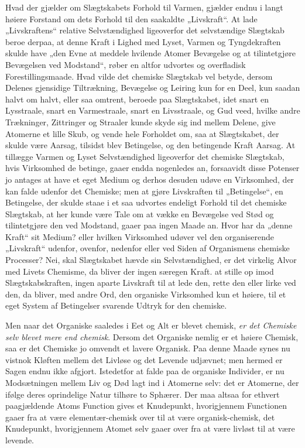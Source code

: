 \documentclass[12pt,a4paper]{book}
\begin{document}
Hvad der gjælder om Slægtskabets Forhold til Varmen, gjælder endnu
i langt høiere Forstand om dets Forhold til den saakaldte
„Livskraft“. At lade „Livskraftens“ relative Selvstændighed
ligeoverfor det selvstændige Slægtskab beroe derpaa, at denne Kraft
i Lighed med Lyset, Varmen og Tyngdekraften skulde have „den Evne
at meddele hvilende Atomer Bevægelse og at tilintetgjøre Bevægelsen
ved Modstand“, røber en altfor udvortes og overfladisk
Forestillingsmaade. Hvad vilde det chemiske Slægtskab vel betyde,
dersom Delenes gjensidige Tiltrækning, Bevægelse og Leiring kun for
en Deel, kun saadan halvt om halvt, eller saa omtrent, beroede paa
Slægtskabet, idet snart en Lysstraale, snart en Varmestraale, snart
en Livsstraale, og Gud veed,
hvilke andre Trækninger, Zittringer og Straaler kunde skyde sig ind
mellem Delene, give Atomerne et lille Skub, og vende hele Forholdet
om, saa at Slægtskabet, der skulde være Aarsag, tilsidst blev
Betingelse, og den betingende Kraft Aarsag. At tillægge Varmen og
Lyset Selvstændighed ligeoverfor det chemiske Slægtskab, hvis
Virksomhed de betinge, gaaer endda nogenledes an, forsaavidt disse
Potenser jo antages at have et eget Medium og derhos desuden udøve
en Virksomhed, der kan falde udenfor det Chemiske; men at gjøre
Livskraften til „Betingelse“, en Betingelse, der skulde staae i et
saa udvortes endeligt Forhold til det chemiske Slægtskab, at her
kunde være Tale om at vække en Bevægelse ved Stød og tilintetgjøre
den ved Modstand, gaaer paa ingen Maade an. Hvor har da „denne
Kraft“ sit Medium? eller hvilken Virksomhed udøver vel den
organiserende „Livskraft“ udenfor, ovenfor, nedenfor eller ved
Siden af Organismens chemiske Processer? Nei, skal Slægtskabet
hævde sin Selvstændighed, er det virkelig Alvor med Livets
Chemisme, da bliver der ingen særegen Kraft. at stille op imod
Slægtskabskraften, ingen aparte Livskraft til at lede den, rette
den eller lirke ved den, da bliver, med andre Ord, den organiske
Virksomhed kun et høiere, til et eget System af Betingelser
svarende Udtryk for den chemiske.

Men naar det Organiske saaledes i Eet og Alt er blevet chemisk,
\emph{er det Chemiske selv blevet mere end chemisk}. Dersom det
Organiske nemlig er et høiere Chemisk, saa er det Chemiske jo
omvendt et lavere Organisk. Paa denne Maade synes nu vistnok
Kløften mellem det Livløse og det Levende udjævnet; men hermed er
Sagen endnu ikke afgjort. Istedetfor at falde paa de organiske
Individer, er nu Modsætningen mellem Liv og Død lagt ind i Atomerne
selv: det er Atomerne, der ifølge deres oprindelige Natur tilhøre
to Sphærer. Der maa altsaa for ethvert paagjældende Atoms Function
gives et Knudepunkt, hvorigjennem Functionen gaaer
fra at være elementær-chemisk over til at være organisk-chemisk,
det Knudepunkt, hvorigjennem Atomet selv gaaer over fra at være
livløst til at være levende.
\end{document}
